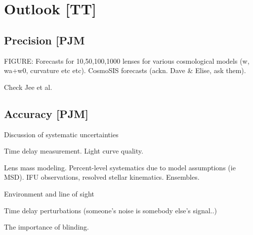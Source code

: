 



\section{Outlook [TT]}
\label{sec:outlook}



\subsection{Precision [PJM}

FIGURE: Forecasts for 10,50,100,1000 lenses for various cosmological models (w, wa+w0, curvature etc etc). CosmoSIS forecasts (ackn. Dave \& Elise, ask them). 

Check Jee et al.




\subsection{Accuracy [PJM]}



Discussion of systematic uncertainties

Time delay measurement. Light curve quality. 

Lens mass modeling. Percent-level systematics due to model assumptions (ie MSD). IFU observations, resolved stellar kinematics. Ensembles. 

Environment and line of sight

Time delay perturbations (someone's noise is somebody else's signal..)

The importance of blinding.

